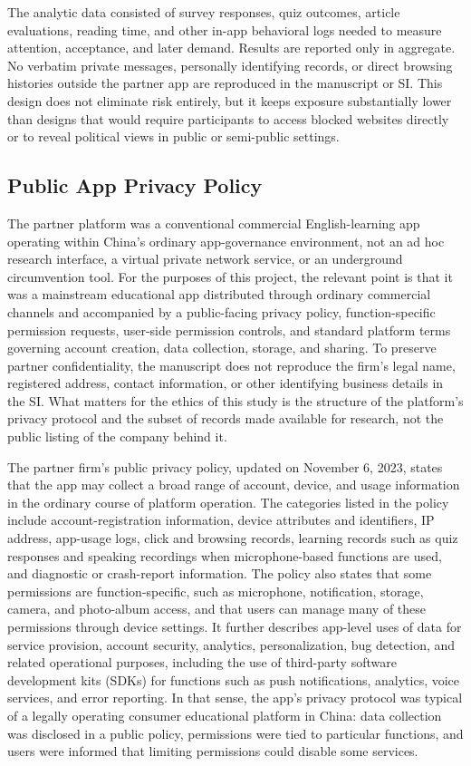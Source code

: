 \documentclass[12pt,american]{article}
\begin{document}
\begin{refsection}
		The analytic data consisted of survey responses, quiz outcomes, article evaluations, reading time, and other in-app behavioral logs needed to measure attention, acceptance, and later demand. Results are reported only in aggregate. No verbatim private messages, personally identifying records, or direct browsing histories outside the partner app are reproduced in the manuscript or SI. This design does not eliminate risk entirely, but it keeps exposure substantially lower than designs that would require participants to access blocked websites directly or to reveal political views in public or semi-public settings.
		
		\subsection{Public App Privacy Policy}
		
		The partner platform was a conventional commercial English-learning app operating within China's ordinary app-governance environment, not an ad hoc research interface, a virtual private network service, or an underground circumvention tool. For the purposes of this project, the relevant point is that it was a mainstream educational app distributed through ordinary commercial channels and accompanied by a public-facing privacy policy, function-specific permission requests, user-side permission controls, and standard platform terms governing account creation, data collection, storage, and sharing. To preserve partner confidentiality, the manuscript does not reproduce the firm's legal name, registered address, contact information, or other identifying business details in the SI. What matters for the ethics of this study is the structure of the platform's privacy protocol and the subset of records made available for research, not the public listing of the company behind it.
		
		The partner firm's public privacy policy, updated on November 6, 2023, states that the app may collect a broad range of account, device, and usage information in the ordinary course of platform operation. The categories listed in the policy include account-registration information, device attributes and identifiers, IP address, app-usage logs, click and browsing records, learning records such as quiz responses and speaking recordings when microphone-based functions are used, and diagnostic or crash-report information. The policy also states that some permissions are function-specific, such as microphone, notification, storage, camera, and photo-album access, and that users can manage many of these permissions through device settings. It further describes app-level uses of data for service provision, account security, analytics, personalization, bug detection, and related operational purposes, including the use of third-party software development kits (SDKs) for functions such as push notifications, analytics, voice services, and error reporting. In that sense, the app's privacy protocol was typical of a legally operating consumer educational platform in China: data collection was disclosed in a public policy, permissions were tied to particular functions, and users were informed that limiting permissions could disable some services.
		

\end{refsection}
\end{document}
